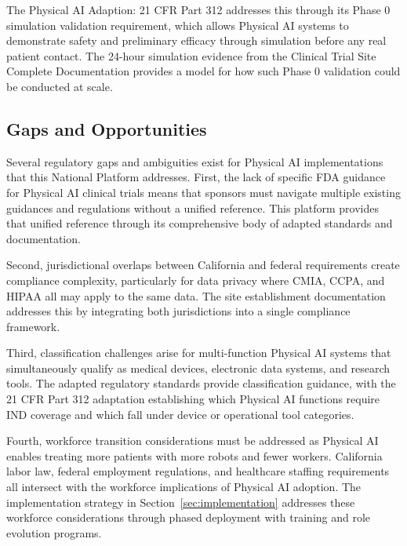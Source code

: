 The Physical AI Adaption: 21 CFR Part 312 \cite{cfr312-adapt} addresses this
through its Phase 0 simulation validation requirement, which allows Physical
AI systems to demonstrate safety and preliminary efficacy through simulation
before any real patient contact. The 24-hour simulation evidence from the
Clinical Trial Site Complete Documentation \cite{site-docs} provides a model
for how such Phase 0 validation could be conducted at scale.

\subsection{Gaps and Opportunities}
\label{subsec:gaps-opportunities}

Several regulatory gaps and ambiguities exist for Physical AI implementations
that this National Platform addresses. First, the lack of specific FDA guidance
for Physical AI clinical trials means that sponsors must navigate multiple
existing guidances and regulations without a unified reference. This platform
provides that unified reference through its comprehensive body of adapted
standards and documentation.

Second, jurisdictional overlaps between California and federal requirements
create compliance complexity, particularly for data privacy where CMIA, CCPA,
and HIPAA all may apply to the same data. The site establishment documentation
\cite{site-docs} addresses this by integrating both jurisdictions into a single
compliance framework.

Third, classification challenges arise for multi-function Physical AI systems
that simultaneously qualify as medical devices, electronic data systems, and
research tools. The adapted regulatory standards provide classification
guidance, with the 21 CFR Part 312 adaptation \cite{cfr312-adapt} establishing
which Physical AI functions require IND coverage and which fall under device
or operational tool categories.

Fourth, workforce transition considerations must be addressed as Physical AI
enables treating more patients with more robots and fewer workers. California
labor law, federal employment regulations, and healthcare staffing requirements
all intersect with the workforce implications of Physical AI adoption. The
implementation strategy in Section~\ref{sec:implementation} addresses these
workforce considerations through phased deployment with training and role
evolution programs.

\clearpage

